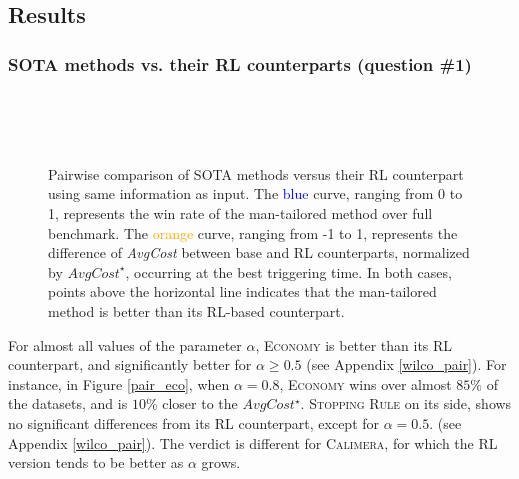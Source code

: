 \documentclass[sigconf, nonacm, table]{acmart}
\begin{document}
\subsection{Results}

\subsubsection{SOTA methods vs. their RL counterparts {\bf (question \#1)}}

\begin{figure}[!htb]
    \centering
     \\
     \\
     \\
    \caption{Pairwise comparison of SOTA methods versus their RL counterpart using same information as input. The \textcolor{blue}{blue} curve, ranging from 0 to 1, represents the win rate of the man-tailored method over full benchmark. The \textcolor{orange}{orange} curve, ranging from -1 to 1, represents the difference of \textit{AvgCost} between base and RL counterparts, normalized by $\textit{AvgCost}^{\star}$, occurring at the best triggering time. In both cases, points above the horizontal line indicates that the man-tailored method is better than its RL-based counterpart. %
    }
    \label{fig:pairwise}
\end{figure}



For almost all values of the parameter $\alpha$, \textsc{Economy} is better than its RL counterpart, and significantly better for $\alpha \geq 0.5$ (see Appendix \ref{wilco_pair}). For instance, in Figure \ref{pair_eco}, when $\alpha = 0.8$, \textsc{Economy} wins over almost $85\%$ of the datasets, and is $10\%$ closer to the $AvgCost^{\star}$.
\textsc{Stopping Rule} on its side, shows no significant differences from its RL counterpart, except for $\alpha = 0.5$. (see Appendix \ref{wilco_pair}). 
The verdict is different for \textsc{Calimera}, for which the RL version tends to be better as $\alpha$ grows.
\end{document}
